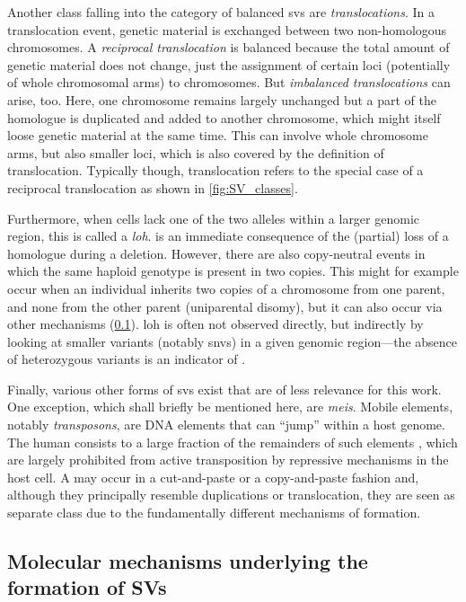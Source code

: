Another class falling into the category of balanced \acp{sv} are
\emph{translocations}. In a translocation event, genetic
material is exchanged between two non-homologous chromosomes. A \emph{reciprocal
translocation} is balanced because the total amount of genetic material does
not change, just the assignment of certain loci (potentially of whole chromosomal arms)
to chromosomes.
But \emph{imbalanced translocations} can arise, too. Here, one chromosome remains
largely unchanged but a part of the homologue is duplicated and added to another
chromosome, which might itself loose genetic material at the same time. This can
involve whole chromosome arms, but also smaller loci, which is also covered by
the definition of translocation. Typically though, translocation refers to the
special case of a reciprocal translocation as shown in \cref{fig:SV_classes}.

Furthermore, when cells lack one of the two alleles within a larger genomic region,
this is called a \emph{\acf{loh}}. \loh is an immediate consequence of the
(partial) loss of a homologue during a deletion.
However, there are also copy-neutral \loh events in which the same haploid
genotype is present in two copies. This might for example occur when an
individual inherits two copies of a chromosome from one parent, and none from the
other parent (uniparental disomy), but it can also occur via other mechanisms
(\cref{sec:mechanisms}). \Ac{loh} is often not observed directly, but indirectly
by looking at smaller variants (notably \acp{snv}) in a given genomic
region---the absence of heterozygous variants is an indicator of \loh.

Finally, various other forms of \acp{sv} exist that are of less relevance for
this work. One exception, which shall briefly be mentioned here, are
\emph{\acfp{mei}}. Mobile elements, notably \emph{transposons}, are DNA elements
that can ``jump'' within a host genome. The human consists to a large fraction of
the remainders of such elements \citep{Haubold2006}, which are largely
prohibited from active transposition by repressive mechanisms in the host cell.
A \mei may occur in a cut-and-paste or a copy-and-paste fashion and, although
they principally resemble duplications or translocation, they are seen as
separate class due to the fundamentally different mechanisms of formation.





\subsection{Molecular mechanisms underlying the formation of SVs}
\label{sec:mechanisms}

